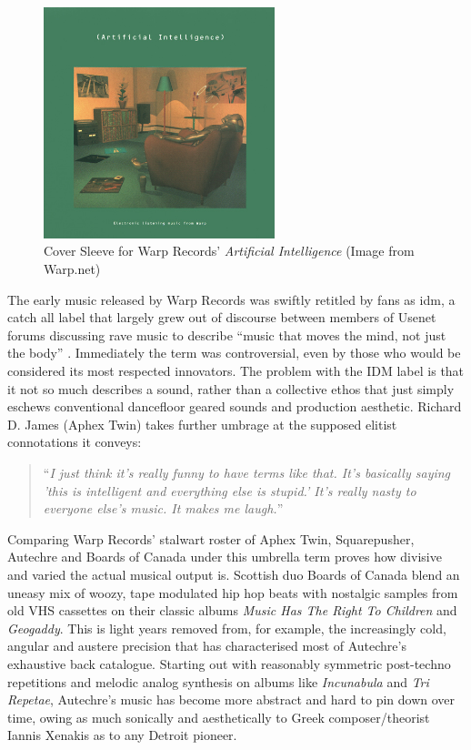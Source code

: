 \begin{figure}
	\begin{center}
		\includegraphics[width=0.6\textwidth]{ch02_dancemusic/figures/warp.jpg}
	\end{center}
	\caption[Cover Sleeve for Artificial Intelligence]{Cover Sleeve for Warp Records' \textit{Artificial Intelligence} (Image from Warp.net)}
	\label{fig:roland}
\end{figure}

The early music released by Warp Records was swiftly retitled by fans as \acrfull{idm}, a catch all label that largely grew out of discourse between members of Usenet forums discussing rave music to describe “music that moves the mind, not just the body” \citep{Alwakeel2009}. Immediately the term was controversial, even by those who would be considered its most respected innovators.  The problem with the IDM label is that it not so much describes a sound, rather than a collective ethos that just simply eschews conventional dancefloor geared sounds and production aesthetic. Richard D. James (Aphex Twin) takes further umbrage at the supposed elitist connotations it conveys:

\blockcquote[]{Haworth2015}{``\textit{I just think it's really funny to have terms like that. It's basically saying 'this is intelligent and everything else is stupid.' It's really nasty to everyone else's music. It makes me laugh.}''}

Comparing Warp Records’ stalwart roster of Aphex Twin, Squarepusher, Autechre and Boards of Canada under this umbrella term proves how divisive and varied the actual musical output is. Scottish duo Boards of Canada blend an uneasy mix of woozy, tape modulated hip hop beats with nostalgic samples from old VHS cassettes on their classic albums \textit{Music Has The Right To Children} and \textit{Geogaddy}. This is light years removed from, for example, the increasingly cold, angular and austere precision that has characterised most of Autechre’s exhaustive back catalogue. Starting out with reasonably symmetric post-techno repetitions and melodic analog synthesis on albums like \textit{Incunabula} and \textit{Tri Repetae}, Autechre’s music has become more abstract and hard to pin down over time, owing as much sonically and aesthetically to Greek composer/theorist Iannis Xenakis as to any Detroit pioneer.

